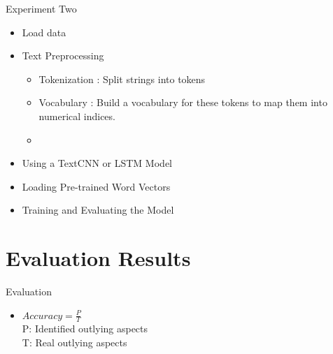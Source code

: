 \documentclass[
 size=14pt,
 paper=smartboard,  %
 mode=present, 		%
 display=slides, 	%
 style=tuliplab,  	%
 pauseslide,
 fleqn,leqno]{powerdot}
\begin{document}
\begin{slide}{Experiment Two }
\bigskip

\begin{itemize}

\item 
Load data
\item 
Text Preprocessing

\begin{itemize}
	\item 
	Tokenization : Split strings into tokens
	\item 
	Vocabulary : Build a vocabulary for these tokens to map them into numerical indices.
	\item 
	
\end{itemize}

\item 
Using a TextCNN or LSTM Model

\item 
Loading Pre-trained Word Vectors

\item 
Training and Evaluating the Model

\end{itemize}

\end{slide}



\section{Evaluation Results}


\begin{slide}[toc=,bm=]{Evaluation}

\begin{center}
\begin{itemize}

\item
\smallskip
\large
{$Accuracy = \frac{P}{T}$ \\
P: Identified outlying aspects \\

T: Real outlying aspects}

\end{itemize}
\end{center}

\end{slide}
\end{document}
